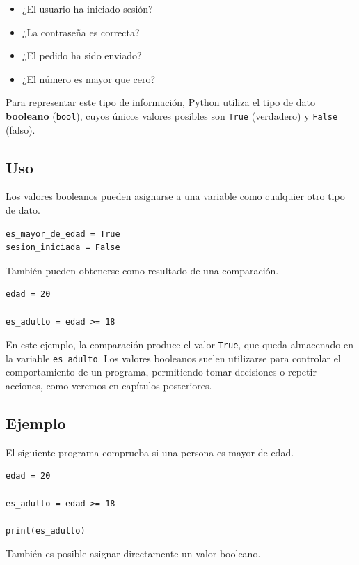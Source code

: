 \documentclass[11pt,a5paper,twoside]{book}
\begin{document}
\begin{itemize}
\item  ¿El usuario ha iniciado sesión?
\item  ¿La contraseña es correcta?
\item  ¿El pedido ha sido enviado?
\item  ¿El número es mayor que cero?
\end{itemize}
Para representar este tipo de información, Python utiliza el tipo de dato \textbf{booleano} ({\scriptsize \texttt{bool}}), cuyos únicos valores posibles son {\scriptsize \texttt{True}} (verdadero) y {\scriptsize \texttt{False}} (falso).
\subsection{Uso}
Los valores booleanos pueden asignarse a una variable como cualquier otro tipo de dato.


\begin{tcolorbox}
\scriptsize
 \begin{verbatim}
es_mayor_de_edad = True
sesion_iniciada = False
\end{verbatim}
\end{tcolorbox}
También pueden obtenerse como resultado de una comparación.


\begin{tcolorbox}
\scriptsize
 \begin{verbatim}
edad = 20

es_adulto = edad >= 18
\end{verbatim}
\end{tcolorbox}
En este ejemplo, la comparación produce el valor {\scriptsize \texttt{True}}, que queda almacenado en la variable {\scriptsize \texttt{es\_adulto}}.
Los valores booleanos suelen utilizarse para controlar el comportamiento de un programa, permitiendo tomar decisiones o repetir acciones, como veremos en capítulos posteriores.
\subsection{Ejemplo}
El siguiente programa comprueba si una persona es mayor de edad.


\begin{tcolorbox}
\scriptsize
 \begin{verbatim}
edad = 20

es_adulto = edad >= 18

print(es_adulto)
\end{verbatim}
\end{tcolorbox}
También es posible asignar directamente un valor booleano.
\end{document}
